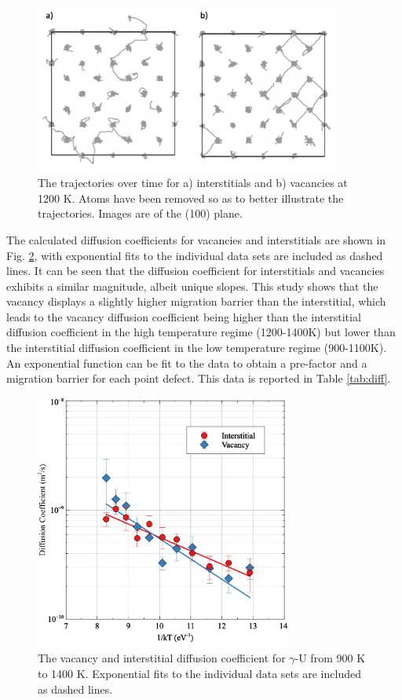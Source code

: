 \documentclass[review]{elsarticle}
\begin{document}
 \begin{figure}[h]
 \centering
 \includegraphics[width=0.9\textwidth]{7_trajectories.png} 
 \caption{The trajectories over time for a) interstitials and b) vacancies at 1200 K. Atoms have been removed so as to better illustrate the trajectories. Images are of the (100) plane. }
 \label{fig:traject}
\end{figure}

\FloatBarrier

The calculated diffusion coefficients for vacancies and interstitials are shown in Fig. \ref{fig:diff}, with exponential fits to the individual data sets are included as dashed lines. It can be seen that the diffusion coefficient for interstitials and vacancies exhibits a similar magnitude, albeit unique slopes. This study shows that the vacancy displays a slightly higher migration barrier than the interstitial, which leads to the vacancy diffusion coefficient being higher than the interstitial diffusion coefficient in the high temperature regime (1200-1400K) but lower than the interstitial diffusion coefficient in the low temperature regime (900-1100K).  An exponential function can be fit to the data to obtain a pre-factor and a migration barrier for each point defect. This data is reported in Table \ref{tab:diff}. 

 \begin{figure}[h]
 \centering
 \includegraphics[width=0.75\textwidth]{8_diff.png} 
 \caption{The vacancy and interstitial diffusion coefficient for $\gamma$-U from 900 K to 1400 K. Exponential fits to the individual data sets are included as dashed lines.}
 \label{fig:diff}
\end{figure}
\end{document}
